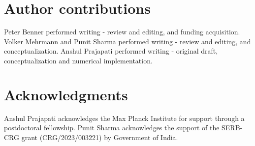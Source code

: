 \documentclass[11pt]{article}
\begin{document}
\section*{Author contributions}%
 Peter Benner performed writing - review and editing, and funding acquisition. Volker Mehrmann and Punit Sharma performed writing - review and editing, and conceptualization.
 Anshul Prajapati performed writing - original draft, conceptualization and numerical implementation.


\section*{Acknowledgments}%
%
Anshul Prajapati acknowledges the Max Planck Institute for support through a postdoctoral fellowship. Punit Sharma acknowledges the support of the SERB-CRG grant (CRG/2023/003221) by Government of India.
\end{document}
